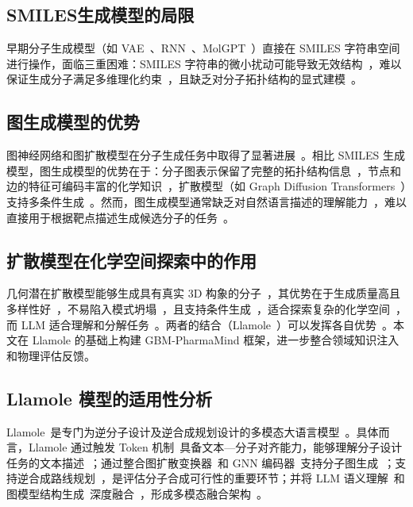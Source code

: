 \subsection{SMILES生成模型的局限}

早期分子生成模型（如 VAE~\cite{GomezBombarelli2018}、RNN~\cite{Segler2017}、MolGPT~\cite{Bagal2021}）直接在 SMILES 字符串空间进行操作，面临三重困难：SMILES 字符串的微小扰动可能导致无效结构~\cite{Bagal2021}，难以保证生成分子满足多维理化约束~\cite{Grisoni2023}，且缺乏对分子拓扑结构的显式建模~\cite{Xu2019}。

\subsection{图生成模型的优势}

图神经网络和图扩散模型在分子生成任务中取得了显著进展~\cite{Liu2024GraphDiffusion,Xu2023}。相比 SMILES 生成模型，图生成模型的优势在于：分子图表示保留了完整的拓扑结构信息~\cite{Xu2019}，节点和边的特征可编码丰富的化学知识~\cite{Gilmer2017}，扩散模型（如 Graph Diffusion Transformers~\cite{Liu2024GraphDiffusion}）支持多条件生成~\cite{Liu2024GraphDiffusion}。然而，图生成模型通常缺乏对自然语言描述的理解能力~\cite{liu2025multimodal}，难以直接用于根据靶点描述生成候选分子的任务~\cite{liu2025multimodal}。

\subsection{扩散模型在化学空间探索中的作用}

几何潜在扩散模型能够生成具有真实 3D 构象的分子~\cite{Xu2023}，其优势在于生成质量高且多样性好~\cite{Xu2023}，不易陷入模式坍塌~\cite{Liu2024GraphDiffusion}，且支持条件生成~\cite{Liu2024GraphDiffusion}，适合探索复杂的化学空间~\cite{Xu2023}，而 LLM 适合理解和分解任务~\cite{Wei2022,Yao2023}。两者的结合（Llamole~\cite{liu2025multimodal}）可以发挥各自优势~\cite{liu2025multimodal}。本文在 Llamole 的基础上构建 GBM-PharmaMind 框架，进一步整合领域知识注入和物理评估反馈。

\subsection{Llamole 模型的适用性分析}

Llamole~\cite{liu2025multimodal}是专门为逆分子设计及逆合成规划设计的多模态大语言模型~\cite{liu2025multimodal}。具体而言，Llamole 通过触发 Token 机制~\cite{liu2025multimodal}具备文本—分子对齐能力，能够理解分子设计任务的文本描述~\cite{liu2025multimodal}；通过整合图扩散变换器~\cite{Liu2024GraphDiffusion}和 GNN 编码器~\cite{Gilmer2017}支持分子图生成~\cite{liu2025multimodal}；支持逆合成路线规划~\cite{liu2025multimodal}，是评估分子合成可行性的重要环节；并将 LLM 语义理解~\cite{Qwen2Team2024}和图模型结构生成~\cite{Liu2024GraphDiffusion}深度融合~\cite{liu2025multimodal}，形成多模态融合架构~\cite{liu2025multimodal}。

